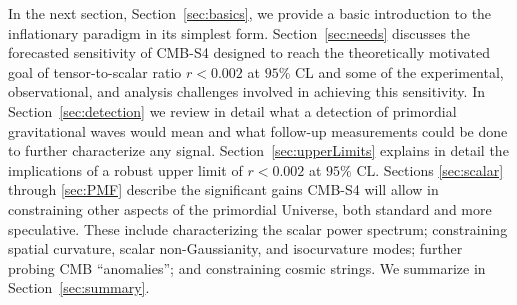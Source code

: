 

In the next section, Section~\ref{sec:basics}, we provide a basic introduction to the inflationary paradigm in its simplest form. Section~\ref{sec:needs} discusses the forecasted sensitivity of CMB-S4 designed to reach the theoretically motivated goal of  tensor-to-scalar ratio $r<0.002$ at $95\%$ CL and some of the experimental, observational, and analysis challenges involved in achieving this sensitivity. In Section~\ref{sec:detection} we review in detail what a detection of primordial gravitational waves would mean and what follow-up measurements could be done to further characterize any signal. Section~\ref{sec:upperLimits} explains in detail the implications of a robust upper limit of $r<0.002$ at $95\%$ CL. Sections \ref{sec:scalar} through \ref{sec:PMF} describe the significant gains CMB-S4 will allow in constraining other aspects of the primordial Universe, both standard and more speculative. These include characterizing the scalar power spectrum; constraining spatial curvature, scalar non-Gaussianity, and isocurvature modes; further probing CMB ``anomalies''; and constraining cosmic strings. We summarize in Section~\ref{sec:summary}.
 

